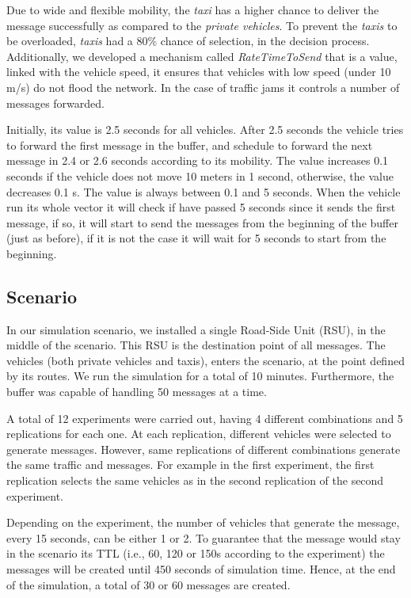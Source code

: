 \documentclass[letterpaper, 10 pt, conference]{ieeeconf}  %
\begin{document}
Due to wide and flexible mobility, the \emph{taxi} has a higher chance to deliver the message successfully as compared to the \emph{private vehicles}. To prevent the \emph{taxis} to be overloaded, \emph{taxis} had a 80\% chance of selection, in the decision process. Additionally, we developed a mechanism called \emph{RateTimeToSend} that is a value, linked with the vehicle speed, it ensures that vehicles with low speed (under 10 m/s) do not flood the network. In the case of traffic jams it controls a number of messages forwarded.

Initially, its value is 2.5 seconds for all vehicles. After 2.5 seconds the vehicle tries to forward the first message in the buffer, and schedule to forward the next message in 2.4 or 2.6 seconds according to its mobility. The value increases 0.1 seconds if the vehicle does not move 10 meters in 1 second, otherwise, the value decreases 0.1 s. The value is always between 0.1 and 5 seconds. When the vehicle run its whole vector it will check if have passed 5 seconds since it sends the first message, if so, it will start to send the messages from the beginning of the buffer (just as before), if it is not the case it will wait for 5 seconds to start from the beginning.

\subsection{Scenario}

In our simulation scenario, we installed a single Road-Side Unit (RSU), in the middle of the scenario. This RSU is the destination point of all messages. The vehicles (both private vehicles  and taxis), enters the scenario, at the point defined by its routes. We run the simulation for a total of 10 minutes. Furthermore, the buffer was capable of handling 50 messages at a time.

A total of 12 experiments were carried out, having 4 different combinations and 5 replications for each one. At each replication, different vehicles were selected to generate messages. However, same replications of different combinations generate the same traffic and messages. For example in the first experiment, the first replication selects the same vehicles as in the second replication of the second experiment.

Depending on the experiment, the number of vehicles that generate the message, every 15 seconds, can be either 1 or 2. To guarantee that the message would stay in the scenario its TTL (i.e., 60, 120 or 150s according to the experiment) the messages will be created until 450 seconds of simulation time. Hence, at the end of the simulation, a total of 30 or 60 messages are created.
\end{document}
